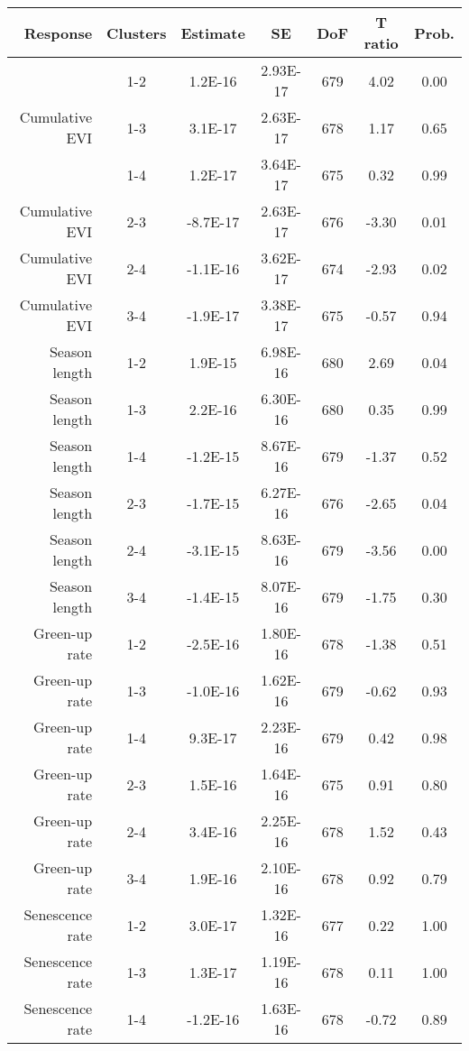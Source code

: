 \begin{table}[H]
\centering
\begin{tabular}{rcccccc}
  \hline
Response & Clusters & Estimate & SE & DoF & T ratio & Prob. \\ 
  \hline
\multirow{3}{*}{Cumulative EVI} & 1-2 & 1.2E-16 & 2.93E-17 & 679 & 4.02 & 0.00 \\ 
& 1-3 & 3.1E-17 & 2.63E-17 & 678 & 1.17 & 0.65 \\ 
& 1-4 & 1.2E-17 & 3.64E-17 & 675 & 0.32 & 0.99 \\ 
  Cumulative EVI & 2-3 & -8.7E-17 & 2.63E-17 & 676 & -3.30 & 0.01 \\ 
  Cumulative EVI & 2-4 & -1.1E-16 & 3.62E-17 & 674 & -2.93 & 0.02 \\ 
  Cumulative EVI & 3-4 & -1.9E-17 & 3.38E-17 & 675 & -0.57 & 0.94 \\ 
   \hline
Season length & 1-2 & 1.9E-15 & 6.98E-16 & 680 & 2.69 & 0.04 \\ 
  Season length & 1-3 & 2.2E-16 & 6.30E-16 & 680 & 0.35 & 0.99 \\ 
  Season length & 1-4 & -1.2E-15 & 8.67E-16 & 679 & -1.37 & 0.52 \\ 
  Season length & 2-3 & -1.7E-15 & 6.27E-16 & 676 & -2.65 & 0.04 \\ 
  Season length & 2-4 & -3.1E-15 & 8.63E-16 & 679 & -3.56 & 0.00 \\ 
  Season length & 3-4 & -1.4E-15 & 8.07E-16 & 679 & -1.75 & 0.30 \\ 
   \hline
Green-up rate & 1-2 & -2.5E-16 & 1.80E-16 & 678 & -1.38 & 0.51 \\ 
  Green-up rate & 1-3 & -1.0E-16 & 1.62E-16 & 679 & -0.62 & 0.93 \\ 
  Green-up rate & 1-4 & 9.3E-17 & 2.23E-16 & 679 & 0.42 & 0.98 \\ 
  Green-up rate & 2-3 & 1.5E-16 & 1.64E-16 & 675 & 0.91 & 0.80 \\ 
  Green-up rate & 2-4 & 3.4E-16 & 2.25E-16 & 678 & 1.52 & 0.43 \\ 
  Green-up rate & 3-4 & 1.9E-16 & 2.10E-16 & 678 & 0.92 & 0.79 \\ 
   \hline
Senescence rate & 1-2 & 3.0E-17 & 1.32E-16 & 677 & 0.22 & 1.00 \\ 
  Senescence rate & 1-3 & 1.3E-17 & 1.19E-16 & 678 & 0.11 & 1.00 \\ 
  Senescence rate & 1-4 & -1.2E-16 & 1.63E-16 & 678 & -0.72 & 0.89 \\ 

\end{tabular}
\end{table}
